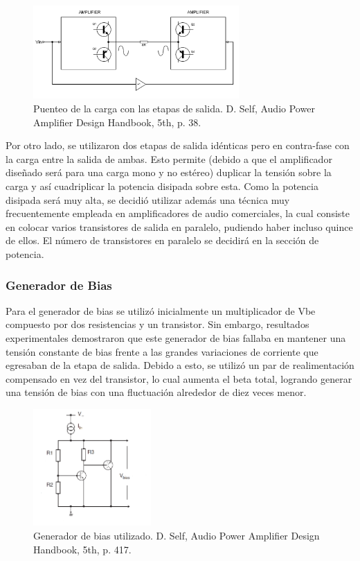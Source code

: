 \begin{figure}[H]
\centering
	\includegraphics[width=0.7\textwidth]{ImagenesOutput-Stage/pag38-bridge_2.png}
	\caption{Puenteo de la carga con las etapas de salida. D. Self, Audio Power Amplifier Design Handbook, 5th, p. 38.}
	\label{fig:bridge}
\end{figure}

Por otro lado, se utilizaron dos etapas de salida idénticas pero en contra-fase con la carga entre la salida de ambas. Esto permite (debido a que el amplificador diseñado será para una carga mono y no estéreo) duplicar la tensión sobre la carga y así cuadriplicar la potencia disipada sobre esta.
Como la potencia disipada será muy alta, se decidió utilizar además una técnica muy frecuentemente empleada en amplificadores de audio comerciales, la cual consiste en colocar varios transistores de salida en paralelo, pudiendo haber incluso quince de ellos. El número de transistores en paralelo se decidirá en la sección de potencia.





\subsubsection{Generador de Bias}

Para el generador de bias se utilizó inicialmente un multiplicador de Vbe compuesto por dos resistencias y un transistor. Sin embargo, resultados experimentales demostraron que este generador de bias fallaba en mantener una tensión constante de bias frente a las grandes variaciones de corriente que egresaban de la etapa de salida. Debido a esto, se utilizó un par de realimentación compensado en vez del transistor, lo cual aumenta el beta total, logrando generar una tensión de bias con una fluctuación alrededor de diez veces menor.

\begin{figure}[H]
\centering
	\includegraphics[width=0.4\textwidth]{ImagenesOutput-Stage/pag417-bias.png}
	\caption{Generador de bias utilizado. D. Self, Audio Power Amplifier Design Handbook, 5th, p. 417.}
	\label{fig:bias}
\end{figure}


